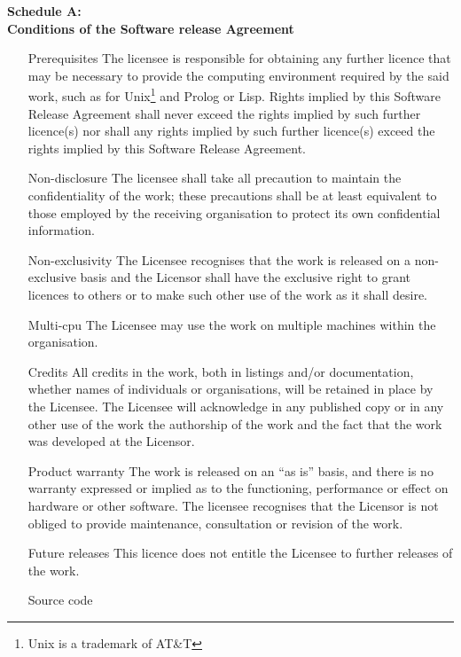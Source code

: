 \fillin \next
{}\fillin
\vspace{1cm}

\begin{center}
    \Large \bf Schedule A: \\
    Conditions of the Software release Agreement
\end{center}
\begin{enumerate}
    \item[Prerequisites]
The licensee is responsible for obtaining any further licence that may
be necessary to provide the computing environment required by the said
work, such as for Unix\footnote{Unix is a trademark of AT\&T} and Prolog
or Lisp.
Rights implied by this Software Release Agreement shall never exceed the
rights implied by such further licence(s) nor shall any rights implied
by such further licence(s) exceed the rights implied by this Software
Release Agreement.
    \item[Non-disclosure]
The licensee shall take all precaution to maintain the confidentiality
of the work; these precautions shall be at least equivalent to those
employed by the receiving organisation to protect its own confidential
information. 
    \item[Non-exclusivity]
The Licensee recognises that the work is released on a non-exclusive
basis and the Licensor shall have the exclusive right to grant licences
to others or to make such other use of the work as it shall desire.
    \item[Multi-cpu]
The Licensee may use the work on multiple machines within the
organisation.
    \item[Credits]
All credits in the work, both in listings and/or documentation, whether
names of individuals or organisations, will be retained in place by the
Licensee. The Licensee will acknowledge in any published copy or in any
other use of the work the authorship of the work and the fact that the
work was developed at the Licensor.
    \item[Product warranty]
The work is released on an ``as is'' basis, and there is no warranty
expressed or  implied as to the functioning, performance or effect on
hardware or other software. The licensee recognises that the Licensor
is not obliged to provide maintenance, consultation or revision of the
work.
    \item[Future releases]
This licence does not entitle the Licensee to further releases of the
work.
    \item[Source code]

\end{enumerate}
